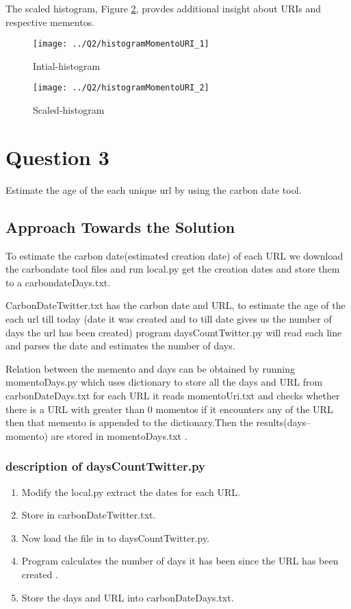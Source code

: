 \documentclass[12pt]{article}
\begin{document}
The scaled histogram, Figure \ref{fig:scaled-histogram}, provdes additional insight about URIs and respective mementos.

\begin{figure}[ht]
\texttt{[image: ../Q2/histogramMomentoURI\_1]}
\centering
\caption{Intial-histogram}
\label{fig:initial-histogram}
\end{figure}
\newpage
\begin{figure}[ht]
\texttt{[image: ../Q2/histogramMomentoURI\_2]}
\centering
\caption{Scaled-histogram}
\label{fig:scaled-histogram}
\end{figure}
\newpage
\section{Question 3}

Estimate the age of the each unique url by using the carbon date tool.
\subsection{Approach Towards the Solution}

To estimate the carbon date(estimated creation date) of each URL we download the carbondate tool files and run local.py get the creation dates and store them to a carbondateDays.txt.

CarbonDateTwitter.txt has the carbon date and URL, to estimate the age of the each url till today (date it was created and to till date gives us the number of days the url has been created) program daysCountTwitter.py will read each line and parses the date and estimates the number of days.

Relation between the memento and days can be obtained by running momentoDays.py which uses dictionary to store all the days and URL from carbonDateDays.txt for each URL it reads momentoUri.txt and checks whether there is a URL with greater than 0 momentos if it encounters any of the URL then that memento is appended to the dictionary.Then the results(days--momento) are stored in momentoDays.txt .
\subsubsection{description of daysCountTwitter.py}
\begin{enumerate}
	\item Modify the local.py extract the dates for each URL.
	\item Store in carbonDateTwitter.txt.
	\item Now load the file in to daysCountTwitter.py.
	\item Program calculates the number of days it has been since the URL has been created .
	\item Store the days and URL into carbonDateDays.txt.	
\end{enumerate}
\end{document}
